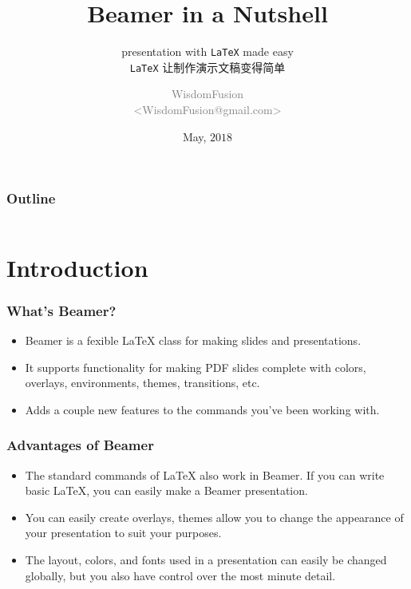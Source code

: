 \documentclass[aspectratio=169,utf8]{beamer}
\title[Beamer Tutorial]{Beamer in a Nutshell}
\subtitle{presentation with \texttt{\LaTeX} made easy\\ \texttt{\LaTeX} 让制作演示文稿变得简单}
\author[WisdomFusion]{\scriptsize \textcolor{gray}{WisdomFusion\\ <WisdomFusion@gmail.com>}}
\date{May, $2018$}
\begin{document}
\addtocounter{framenumber}{-1}


\begin{frame}
  \titlepage
\end{frame}

\begin{frame}
  \frametitle{Outline}

  \centering

  \begin{minipage}{.75\textwidth}

    \begin{columns}[t]
      \begin{column}{.5\textwidth}
        \tableofcontents[sections={1-5}]
      \end{column}
      \begin{column}{.5\textwidth}
        \tableofcontents[sections={6-10}]
      \end{column}      
    \end{columns}

  \end{minipage}

\end{frame}


\section{Introduction}

\begin{frame}
  \frametitle{What's Beamer?}

  \begin{itemize}
    \setlength{\itemsep}{8pt}
    \item Beamer is a fexible \LaTeX{} class for making slides and presentations.
    \item It supports functionality for making PDF slides complete with colors, overlays, environments, themes, transitions, etc.
    \item Adds a couple new features to the commands you've been working with.
  \end{itemize}
  
\end{frame}


\begin{frame}
  \frametitle{Advantages of Beamer}

  \begin{itemize}
    \setlength{\itemsep}{8pt}
    \item The standard commands of \LaTeX{} also work in Beamer. If you can write basic \LaTeX{}, you can easily make a Beamer presentation.
    \item You can easily create overlays, themes allow you to change the appearance of your presentation to suit your purposes.
    \item The layout, colors, and fonts used in a presentation can easily be changed globally, but you also have control over the most minute detail.
  \end{itemize}
  
\end{frame}
\end{document}

